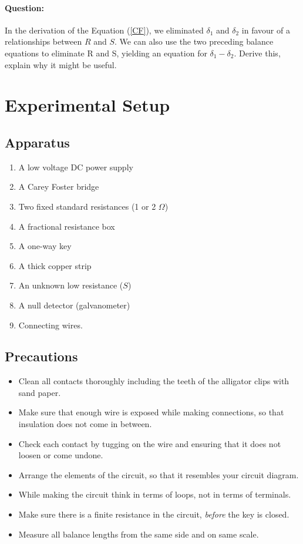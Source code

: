 \begin{refsection}
\begin{question}
\paragraph{Question:} In the derivation of the Equation (\ref{CF}), we eliminated $\delta_1$ and $\delta_2$ in favour of a relationships between $R$ and $S$. We can also use the two preceding balance equations to eliminate R and S, yielding an equation for $\delta_1 - \delta_2$. Derive this, explain why it might be useful.
\end{question}


\section*{Experimental Setup}

\subsection*{Apparatus}

\begin{enumerate}
\item A low voltage DC power supply
\item A Carey Foster bridge
\item Two fixed standard resistances (1 or 2 $\Omega$)
\item A fractional resistance box
\item A one-way key
\item A thick copper strip
\item An unknown low resistance ($S$)
\item A null detector (galvanometer)
\item Connecting wires.
\end{enumerate}


\subsection*{Precautions}
\begin{itemize}
    \item Clean all contacts thoroughly including %
    the teeth of the alligator clips with sand paper.
    \item Make sure that enough wire is exposed while making connections, so that insulation does not come in between.
    \item Check each contact by tugging on the wire and ensuring that it does not loosen or come undone. 
    \item Arrange the elements of the circuit, so that it resembles your circuit diagram.
    \item While making the circuit think in terms of loops, not in terms of terminals. 
    \item Make sure there is a finite resistance in the circuit, \textit{before} the key is closed.
    \item Measure all balance lengths from the same side and on same scale.
\end{itemize}



\end{refsection}
